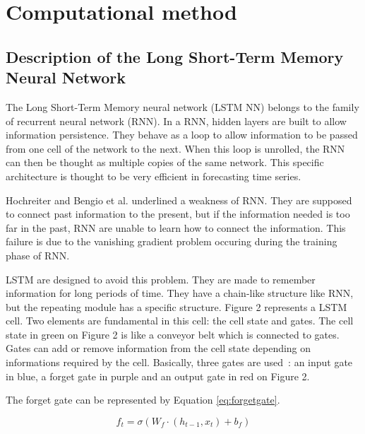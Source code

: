 \section{Computational method}


\subsection{Description of the Long Short-Term Memory Neural Network}

The Long Short-Term Memory neural network (LSTM NN) belongs to the family of recurrent neural network (RNN). 
In a RNN, hidden layers are built to allow information persistence. They behave as a loop to allow information 
to be passed from one cell of the network to the next. When this loop is unrolled, the RNN can then be thought 
as multiple copies of the same network. This specific architecture is thought to be very efficient in 
forecasting time series. 

Hochreiter \cite{hochreiter1991untersuchungen} and Bengio et al. \cite{bengio1994learning} underlined a weakness of RNN. 
They are supposed to connect past information to the present, but if the information needed is too far in the past, 
RNN are unable to learn how to connect the information. This failure is due to the vanishing gradient problem 
occuring during the training phase of RNN. 

LSTM are designed to avoid this problem. They are made to remember information for long periods of time. 
They have a chain-like structure like RNN, but the repeating module has a specific structure. 
Figure 2 represents a LSTM cell. Two elements are fundamental in this cell: the cell state and gates. 
The cell state in green on Figure 2 is like a conveyor belt which is connected to gates. 
Gates can add or remove information from the cell state depending on informations required by the cell. 
Basically, three gates are used : an input gate in blue, a forget gate in purple and an output gate in red 
on Figure 2. 


The forget gate can be represented by Equation \ref{eq:forgetgate}. 



\begin{equation}\label{eq:forgetgate}
 f_{t} = \sigma  \left( W_f \cdot  \left( h_{t-1}, x_t \right) + b_f \right)
\end{equation}

\vspace{\baselineskip}

